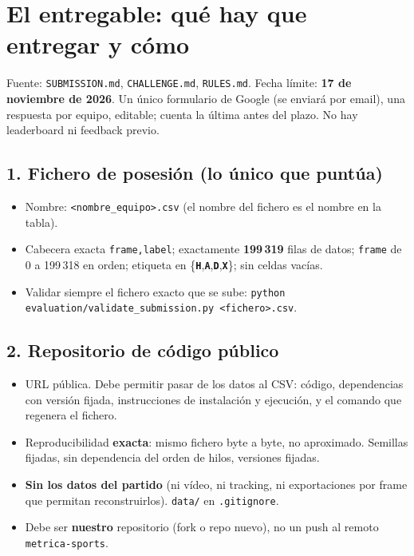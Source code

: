 \documentclass[11pt,a4paper]{article}
\newcommand{\lab}[1]{\texttt{\textbf{#1}}}
\begin{document}
\section{El entregable: qu\'e hay que entregar y c\'omo}

Fuente: \texttt{SUBMISSION.md}, \texttt{CHALLENGE.md}, \texttt{RULES.md}. Fecha l\'imite:
\textbf{17 de noviembre de 2026}. Un \'unico formulario de Google (se enviar\'a por email), una
respuesta por equipo, editable; cuenta la \'ultima antes del plazo. No hay leaderboard ni
feedback previo.

\subsection{1. Fichero de posesi\'on (lo \'unico que punt\'ua)}
\begin{itemize}
  \item Nombre: \texttt{<nombre\_equipo>.csv} (el nombre del fichero es el nombre en la tabla).
  \item Cabecera exacta \texttt{frame,label}; exactamente \textbf{199\,319} filas de datos;
        \texttt{frame} de 0 a 199\,318 en orden; etiqueta en \{\lab{H},\lab{A},\lab{D},\lab{X}\};
        sin celdas vac\'ias.
  \item Validar siempre el fichero exacto que se sube:
        \texttt{python evaluation/validate\_submission.py <fichero>.csv}.
\end{itemize}

\subsection{2. Repositorio de c\'odigo p\'ublico}
\begin{itemize}
  \item URL p\'ublica. Debe permitir pasar de los datos al CSV: c\'odigo, dependencias con
        versi\'on fijada, instrucciones de instalaci\'on y ejecuci\'on, y el comando que regenera
        el fichero.
  \item Reproducibilidad \textbf{exacta}: mismo fichero byte a byte, no aproximado. Semillas
        fijadas, sin dependencia del orden de hilos, versiones fijadas.
  \item \textbf{Sin los datos del partido} (ni v\'ideo, ni tracking, ni exportaciones por frame que
        permitan reconstruirlos). \texttt{data/} en \texttt{.gitignore}.
  \item Debe ser \textbf{nuestro} repositorio (fork o repo nuevo), no un push al remoto
        \texttt{metrica-sports}.
\end{itemize}
\end{document}
